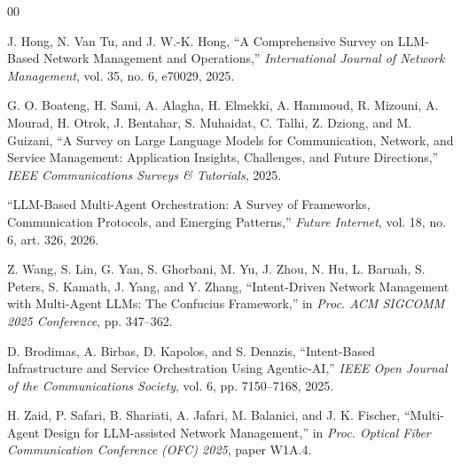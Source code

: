 \documentclass[conference]{IEEEtran}
\begin{document}
\begin{thebibliography}{00}

 J. Hong, N. Van Tu, and J. W.-K. Hong, ``A Comprehensive Survey on LLM-Based Network Management and Operations,'' \textit{International Journal of Network Management}, vol. 35, no. 6, e70029, 2025.

 G. O. Boateng, H. Sami, A. Alagha, H. Elmekki, A. Hammoud, R. Mizouni, A. Mourad, H. Otrok, J. Bentahar, S. Muhaidat, C. Talhi, Z. Dziong, and M. Guizani, ``A Survey on Large Language Models for Communication, Network, and Service Management: Application Insights, Challenges, and Future Directions,'' \textit{IEEE Communications Surveys \& Tutorials}, 2025.

 ``LLM-Based Multi-Agent Orchestration: A Survey of Frameworks, Communication Protocols, and Emerging Patterns,'' \textit{Future Internet}, vol. 18, no. 6, art. 326, 2026.

 Z. Wang, S. Lin, G. Yan, S. Ghorbani, M. Yu, J. Zhou, N. Hu, L. Baruah, S. Peters, S. Kamath, J. Yang, and Y. Zhang, ``Intent-Driven Network Management with Multi-Agent LLMs: The Confucius Framework,'' in \textit{Proc. ACM SIGCOMM 2025 Conference}, pp. 347--362.

 D. Brodimas, A. Birbas, D. Kapolos, and S. Denazis, ``Intent-Based Infrastructure and Service Orchestration Using Agentic-AI,'' \textit{IEEE Open Journal of the Communications Society}, vol. 6, pp. 7150--7168, 2025.

 H. Zaid, P. Safari, B. Shariati, A. Jafari, M. Balanici, and J. K. Fischer, ``Multi-Agent Design for LLM-assisted Network Management,'' in \textit{Proc. Optical Fiber Communication Conference (OFC) 2025}, paper W1A.4.

\end{thebibliography}
\end{document}
